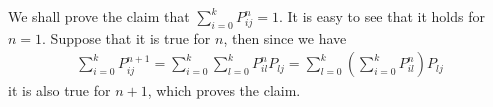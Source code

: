 \documentclass[a4paper,10pt]{article}
\theoremstyle{definition}
\begin{document}
\begin{enumerate}
We shall prove the claim that $\sum^{k}_{i=0}P^n_{ij}=1$. It is easy to see that it holds for $n=1$. Suppose that it is true for $n$, then since we have
\begin{align*}
\sum^{k}_{i=0}P^{n+1}_{ij} = \sum^{k}_{i=0}\sum_{l=0}^{k}P^{n}_{il}P_{lj}= \sum_{l=0}^{k}\left(\sum^{k}_{i=0}P^{n}_{il}\right)P_{lj}
\end{align*}
it is also true for $n+1$, which proves the claim.






\end{enumerate}
\end{document}
